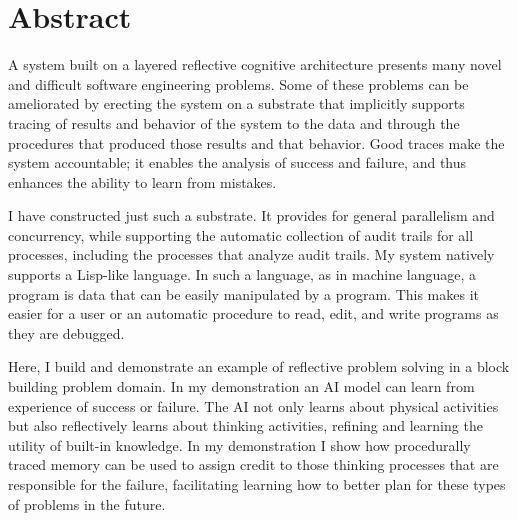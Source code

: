 \begingroup
\let\clearpage\relax
\let\cleardoublepage\relax
\let\cleardoublepage\relax

\chapter*{Abstract}

A system built on a layered reflective cognitive architecture presents
many novel and difficult software engineering problems.  Some of these
problems can be ameliorated by erecting the system on a substrate that
implicitly supports tracing of results and behavior of the system to
the data and through the procedures that produced those results and
that behavior.  Good traces make the system accountable; it enables
the analysis of success and failure, and thus enhances the ability to
learn from mistakes.

I have constructed just such a substrate.  It provides for general
parallelism and concurrency, while supporting the automatic collection
of audit trails for all processes, including the processes that
analyze audit trails.  My system natively supports a Lisp-like
language.  In such a language, as in machine language, a program is
data that can be easily manipulated by a program.  This makes it
easier for a user or an automatic procedure to read, edit, and write
programs as they are debugged.

Here, I build and demonstrate an example of reflective problem solving
in a block building problem domain.  In my demonstration an AI model
can learn from experience of success or failure.  The AI not only
learns about physical activities but also reflectively learns about
thinking activities, refining and learning the utility of built-in
knowledge.  In my demonstration I show how procedurally traced memory
can be used to assign credit to those thinking processes that are
responsible for the failure, facilitating learning how to better plan
for these types of problems in the future.

\endgroup

\vfill

